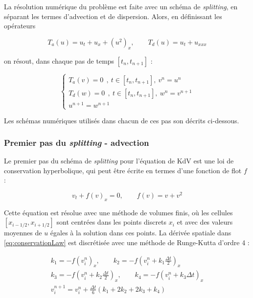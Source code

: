 \indent La résolution numérique du problème est faite avec un schéma de \emph{splitting}, en séparant les termes d'advection et de dispersion. Alors, en définissant les opérateurs

\begin{equation*}
	T_a(u) = u_t + u_x + (u^2)_x, \qquad
	T_d(u) = u_t + u_{xxx}
\end{equation*}

 \noindent on résout, dans chaque pas de temps $[t_n,t_{n+1}]$ :
 
\begin{equation*}
\begin{cases}
   T_a(v) = 0 \ \ ,\ t \in [t_n,t_{n+1}], \  v^n = u^n \\
   T_d(w) = 0 \ \ , \ t \in [t_n,t_{n+1}], \  w^n = v^{n+1} \\
    u^{n+1} = w^{n+1}
\end{cases}
\end{equation*}

\indent Les schémas numériques utilisés dans chacun de ces pas son décrits ci-dessous.

\subsubsection{Premier pas du \emph{splitting} - advection}
\label{sec:KdVSplitted1}

\indent Le premier pas du schéma de \emph{splitting} pour l'équation de KdV est une loi de conservation hyperbolique, qui peut être écrite en termes d'une fonction de flot $f$ :

\begin{equation}
  \label{eq:conservationLaw}
	v_t + f(v)_x = 0,  \qquad f(v) = v + v^2
\end{equation}

\indent Cette équation est résolue avec une méthode de volumes finis, où les cellules $[x_{i-1/2}, x_{i+1/2}]$ sont centrées dans les points discrets $x_i$ et avec des valeurs moyennes de $u$ égales à la solution dans ces points. La dérivée spatiale dans \eqref{eq:conservationLaw} est discrétisée avec une méthode de Runge-Kutta d'ordre 4 :

\begin{equation*}
\begin{gathered}
k_1 = - f(v_i^n)_x, \qquad
k_2 = - f\left(v_i^n + k_1\frac{\Delta t }{2}\right)_x \\
k_3 = - f\left(v_i^n + k_2\frac{\Delta t }{2}\right)_x, \qquad
k_4 = - f(v_i^n + k_3 \Delta t)_x \\
v_i^{n+1} = v_i^n + \frac{\Delta t}{6}(k_1 + 2k_2 + 2k_3 + k_4)
\end{gathered}
\end{equation*}

